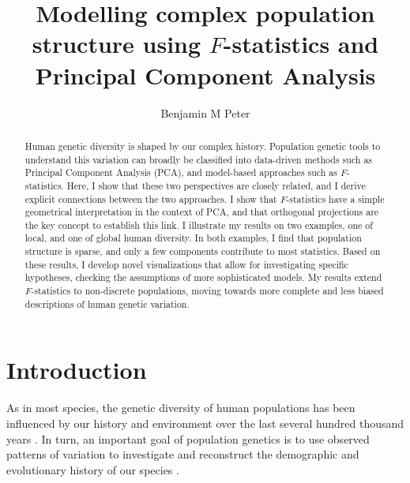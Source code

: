 \documentclass[12pt,fullpage, a4paper]{article}
\title{Modelling complex population structure using $F$-statistics and Principal Component Analysis}
\author{Benjamin M Peter}
\begin{document}
	\maketitle
\begin{abstract}
Human  genetic diversity is shaped by our complex history. Population genetic tools to understand this variation can broadly be classified into data-driven methods such as Principal Component Analysis (PCA), and model-based approaches such as $F$-statistics.
Here, I show that these two perspectives are closely related, and I derive explicit connections between the two approaches. I show that $F$-statistics have a simple geometrical interpretation in the context of PCA, and that orthogonal projections are the key concept to establish this link. I illustrate my results on two examples, one of local, and one of global human diversity. In both examples, I find that population structure is sparse, and only a few components contribute to most statistics. Based on these results, I develop novel visualizations that allow for investigating specific hypotheses, checking the assumptions of more sophisticated models. My results extend $F$-statistics to non-discrete populations, moving towards more complete and less biased descriptions of human genetic variation.
\end{abstract}
\section{Introduction}
As in most species, the genetic diversity of human populations has been influenced by our history and environment over the last several hundred thousand years \citep[e.g][]{cavalli-sforza1994,marciniak2017, reich2018a, nielsen2020}. In turn, an important goal of population genetics is to use observed patterns of variation to  investigate and reconstruct the demographic and evolutionary history of our species \citep{schraiber2015, orlando2021}. 
\end{document}

